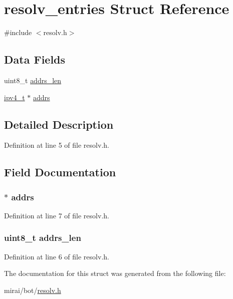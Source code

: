 \hypertarget{structresolv__entries}{}\section{resolv\+\_\+entries Struct Reference}
\label{structresolv__entries}


{\ttfamily \#include $<$resolv.\+h$>$}

\subsection*{Data Fields}
\begin{DoxyCompactItemize}
\item 
uint8\+\_\+t \hyperlink{structresolv__entries_a50d772a92ae471ef852c7b655b3a6fc8}{addrs\+\_\+len}
\item 
\hyperlink{loader_2src_2headers_2includes_8h_aaadf2e480fd246ff9e932039b223baed}{ipv4\+\_\+t} $\ast$ \hyperlink{structresolv__entries_a4ea4fdbeb06a43e5ddde1ea604dc81e9}{addrs}
\end{DoxyCompactItemize}


\subsection{Detailed Description}


Definition at line 5 of file resolv.\+h.



\subsection{Field Documentation}
\subsubsection[{\texorpdfstring{addrs}{addrs}}]{$\ast$ addrs}\hypertarget{structresolv__entries_a4ea4fdbeb06a43e5ddde1ea604dc81e9}{}\label{structresolv__entries_a4ea4fdbeb06a43e5ddde1ea604dc81e9}


Definition at line 7 of file resolv.\+h.

\subsubsection[{\texorpdfstring{addrs\+\_\+len}{addrs_len}}]{\setlength{\rightskip}{0pt plus 5cm}uint8\+\_\+t addrs\+\_\+len}\hypertarget{structresolv__entries_a50d772a92ae471ef852c7b655b3a6fc8}{}\label{structresolv__entries_a50d772a92ae471ef852c7b655b3a6fc8}


Definition at line 6 of file resolv.\+h.



The documentation for this struct was generated from the following file\+:\begin{DoxyCompactItemize}
\item 
mirai/bot/\hyperlink{resolv_8h}{resolv.\+h}\end{DoxyCompactItemize}
